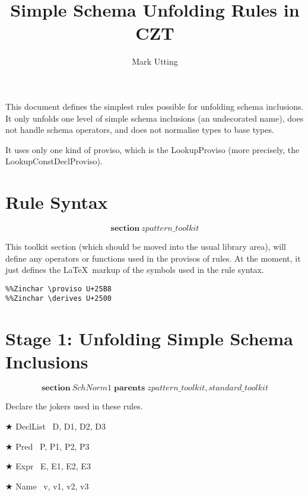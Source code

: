 \documentclass{article}
\title{Simple Schema Unfolding Rules in CZT}
\author{Mark Utting}
\newenvironment{zsection}{\[}{\]}
\newcommand{\SECTION}{\textbf{section}~}
\newcommand{\parents}{\mathrel{\textbf{parents}}}
\newcommand{\derives}{\derive{}}
\newenvironment{zedjoker}[1]{\par$\bigstar$ #1\ }{}
\newcommand{\proviso}{\raisebox{0.5ex}{${}_{\blacktriangleright}\ $}}%
\begin{document}
\maketitle

This document defines the simplest rules possible for
unfolding schema inclusions.  It only unfolds one level of simple schema
inclusions (an undecorated name), does not handle
schema operators, and does not normalise types to base types.

It uses only one kind of proviso, which is the LookupProviso
(more precisely, the LookupConstDeclProviso).

\section*{Rule Syntax}

\begin{zsection}
  \SECTION zpattern\_toolkit
\end{zsection}

This toolkit section (which should be moved into the usual
library area), will define any operators or functions used
in the provisos of rules.  At the moment, it just defines
the \LaTeX\ markup of the symbols used in the rule syntax.


\begin{verbatim}
%%Zinchar \proviso U+25B8
%%Zinchar \derives U+2500
\end{verbatim}




\section*{Stage 1: Unfolding Simple Schema Inclusions}

\begin{zsection}
  \SECTION SchNorm1 \parents zpattern\_toolkit, standard\_toolkit
\end{zsection}

Declare the jokers used in these rules.

\begin{zedjoker}{DeclList} D, D1, D2, D3 \end{zedjoker} \\
\begin{zedjoker}{Pred} P, P1, P2, P3 \end{zedjoker} \\
\begin{zedjoker}{Expr} E, E1, E2, E3 \end{zedjoker} \\
\begin{zedjoker}{Name} v, v1, v2, v3 \end{zedjoker} \\
\end{document}
